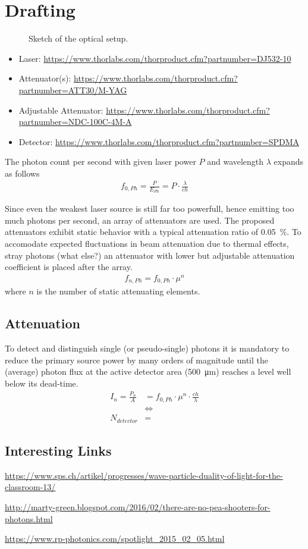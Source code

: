 \chapter{Drafting}
\nocite{*}
\begin{figure}[h]
    \centering
    
    \caption[Sketch of the optical setup]{Sketch of the optical setup.}
    \label{fig:optical setup sketch}
\end{figure}

\begin{itemize}
    \item Laser: \url{https://www.thorlabs.com/thorproduct.cfm?partnumber=DJ532-10}
    \item Attenuator(s): \url{https://www.thorlabs.com/thorproduct.cfm?partnumber=ATT30/M-YAG}
    \item Adjustable Attenuator: \url{https://www.thorlabs.com/thorproduct.cfm?partnumber=NDC-100C-4M-A}
    \item Detector: \url{https://www.thorlabs.com/thorproduct.cfm?partnumber=SPDMA}
\end{itemize}

The photon count per second with given laser power \(P\) and wavelength \(\lambda\) expands as follows
\begin{align}
    f_{0,Ph} = \frac{P}{E_{Ph}} = P \cdot \frac{\lambda}{c h}
    \label{eq:unattenuated photons per second}
\end{align}

Since even the weakest laser source is still far too powerfull, hence emitting too much photons per second, an array of attenuators are used.
The proposed attenuators exhibit static behavior with a typical attenuation ratio of \qty{0.05}{\percent}.
To accomodate expected fluctuations in beam attenuation due to thermal effects, stray photons (what else?) an  attenuator with lower but adjustable attenuation coefficient is placed after the array.
\begin{align}
    f_{n,Ph} = f_{0,Ph} \cdot \mu^n
    \label{eq:attenuated photons per second}
\end{align}
where \(n\) is the number of static attenuating elements.

\section{Attenuation}
    To detect and distinguish single (or pseudo-single) photons it is mandatory to reduce the primary source power by many orders of magnitude until the (average) photon flux at the active detector area (\qty{500}{\micro\metre}) reaches a level well below its dead-time.
    \begin{align}
        I_n = \frac{P_n}{A} &= f_{0,Ph} \cdot \mu^n \cdot \frac{c h}{\lambda}\\
        &\Leftrightarrow\\
        N_{detector} &=
    \end{align}
\section{Interesting Links}
    \url{https://www.sps.ch/artikel/progresses/wave-particle-duality-of-light-for-the-classroom-13/}

    \url{http://marty-green.blogspot.com/2016/02/there-are-no-pea-shooters-for-photons.html}
    
    \url{https://www.rp-photonics.com/spotlight_2015_02_05.html}